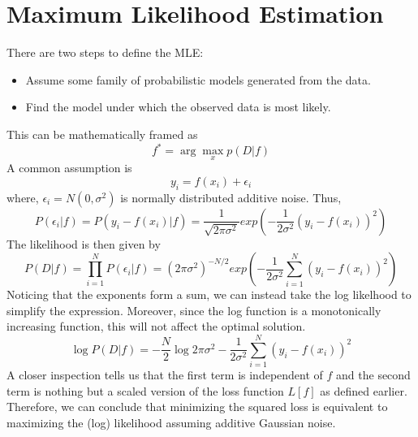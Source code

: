 \section{Maximum Likelihood Estimation}
There are two steps to define the MLE: 
\begin{itemize}
\item Assume some family of probabilistic  models generated from the data.
\item Find the model under which the observed data is most likely.
\end{itemize}
This can be mathematically framed as
\begin{equation}
f^{*}=\arg\max_{x}p(D|f)
\end{equation}
A common assumption is
\begin{equation}
y_{i}=f(x_{i})+\epsilon_{i}
\end{equation}
where, $\epsilon_{i}=N(0,\sigma^2)$ is normally distributed additive noise. 
Thus,
\begin{equation}
P(\epsilon_{i}|f)=P(y_{i}-f(x_{i})|f)=\frac{1}{\sqrt{2\pi \sigma^2}}exp(-\frac{1}{2\sigma^2}(y_{i}-f(x_{i}))^2)
\end{equation}
The likelihood is then given by
\begin{equation}
P(D|f)=\prod_{i=1}^{N}{ P(\epsilon_{i}|f)}=(2\pi \sigma^2)^{-N/2}exp(-\frac{1}{2\sigma^2}\sum_{i=1}^{N}{(y_{i}-f(x_{i}))^2})
\end{equation}
Noticing that the exponents form a sum, we can instead take the log likelhood to simplify the expression. Moreover, since the log function is a monotonically increasing function, this will not affect the optimal solution.
\begin{equation}
\log{P(D|f)}=-\frac{N}{2}\log{2\pi \sigma^{2}}-\frac{1}{2\sigma^2}\sum_{i=1}^{N}{(y_{i}-f(x_{i}))^2}
\end{equation}
A closer inspection tells us that the first term is independent of $f$ and the second term is nothing but a scaled version of the loss function $L[f]$ as defined earlier. Therefore, we can conclude that minimizing the squared loss is equivalent to maximizing the (log) likelihood assuming additive Gaussian  noise. 

